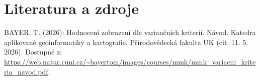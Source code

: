 \section*{Literatura a zdroje}
BAYER, T. (2026): Hodnocení zobrazení dle variančních kriterií. Návod.
Katedra aplikované geoinformatiky a kartografie. Přírodovědecká fakulta UK (cit. 11. 5. 2026). Dostupné z: \url{https://web.natur.cuni.cz/~bayertom/images/courses/mmk/mmk_variacni_kriteria_navod.pdf}.
